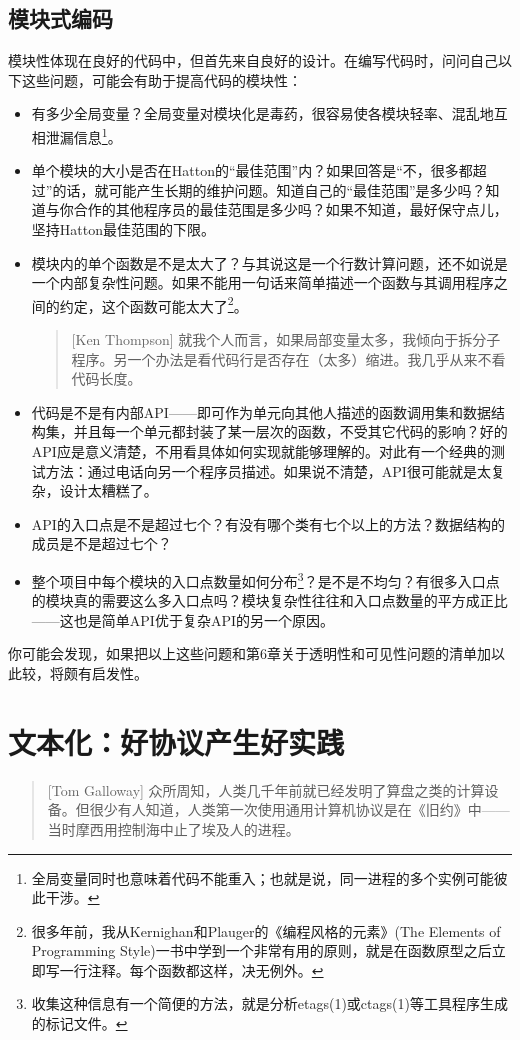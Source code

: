 \documentclass[11pt,oneside]{book}
\begin{document}
\begin{common-format}
\section{模块式编码}
模块性体现在良好的代码中，但首先来自良好的设计。在编写代码时，问问自己以下这些问题，可能会有助于提高代码的模块性：
\begin{itemize}
\item 有多少全局变量？全局变量对模块化是毒药，很容易使各模块轻率、混乱地互相泄漏信息\footnote{全局变量同时也意味着代码不能重入；也就是说，同一进程的多个实例可能彼此干涉。}。
\item 单个模块的大小是否在Hatton的“最佳范围”内？如果回答是“不，很多都超过”的话，就可能产生长期的维护问题。知道自己的“最佳范围”是多少吗？知道与你合作的其他程序员的最佳范围是多少吗？如果不知道，最好保守点儿，坚持Hatton最佳范围的下限。
\item 模块内的单个函数是不是太大了？与其说这是一个行数计算问题，还不如说是一个内部复杂性问题。如果不能用一句话来简单描述一个函数与其调用程序之间的约定，这个函数可能太大了\footnote{很多年前，我从Kernighan和Plauger的《编程风格的元素》(The Elements of Programming Style)一书中学到一个非常有用的原则，就是在函数原型之后立即写一行注释。每个函数都这样，决无例外。}。
\begin{quote}[Ken Thompson]
就我个人而言，如果局部变量太多，我倾向于拆分子程序。另一个办法是看代码行是否存在（太多）缩进。我几乎从来不看代码长度。
\end{quote}
\item 代码是不是有内部API——即可作为单元向其他人描述的函数调用集和数据结构集，并且每一个单元都封装了某一层次的函数，不受其它代码的影响？好的API应是意义清楚，不用看具体如何实现就能够理解的。对此有一个经典的测试方法：通过电话向另一个程序员描述。如果说不清楚，API很可能就是太复杂，设计太糟糕了。
\item API的入口点是不是超过七个？有没有哪个类有七个以上的方法？数据结构的成员是不是超过七个？
\item 整个项目中每个模块的入口点数量如何分布\footnote{收集这种信息有一个简便的方法，就是分析etags(1)或ctags(1)等工具程序生成的标记文件。}？是不是不均匀？有很多入口点的模块真的需要这么多入口点吗？模块复杂性往往和入口点数量的平方成正比——这也是简单API优于复杂API的另一个原因。
\end{itemize}

你可能会发现，如果把以上这些问题和第6章关于透明性和可见性问题的清单加以此较，将颇有启发性。



\chapter{文本化：好协议产生好实践}
\begin{quote}[Tom Galloway]
众所周知，人类几千年前就已经发明了算盘之类的计算设备。但很少有人知道，人类第一次使用通用计算机协议是在《旧约》中——当时摩西用控制海中止了埃及人的进程。
\end{quote}


\end{common-format}
\end{document}
